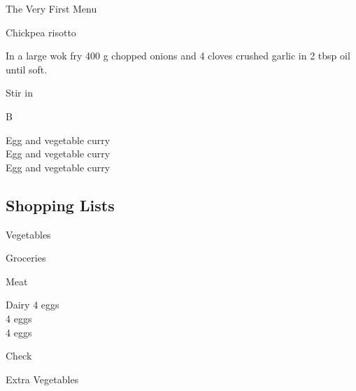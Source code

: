 \begin{menu}{The Very First Menu}
\begin{recipe}{2}{Chickpea risotto}
\begin{ingredients}
		\end{ingredients}
	
    \begin{instructions}
    \item 
        In a large wok fry
        400 g chopped onions
        and
        4 cloves crushed garlic
        in
        2 tbsp  oil
        until soft.
      \item 
        Stir in
      
    \end{instructions}
    \end{recipe}%
  
    \clearpage
    \end{menu}
	
		\begin{menu}{B}

    Egg and vegetable curry\\
    Egg and vegetable curry\\
    Egg and vegetable curry\\
    
    \subsection*{Shopping Lists}
      \begin{shoppinglist}{Vegetables}
      \end{shoppinglist}%
      \begin{shoppinglist}{Groceries}
      \end{shoppinglist}%
      \par\vfil %
      \begin{shoppinglist}{Meat}
      \end{shoppinglist}%
      \begin{shoppinglist}{Dairy}
      4  eggs \\ 
      4  eggs \\ 
      4  eggs \\ 
      \end{shoppinglist}%
      \par\vfil %
      \vfil\clearpage %
      \begin{shoppinglist}{Check}
      \end{shoppinglist}%
      \begin{shoppinglist}{Extra Vegetables}
      \end{shoppinglist}%
      \par\vfil %
    \vfil\clearpage
  

\end{menu}
